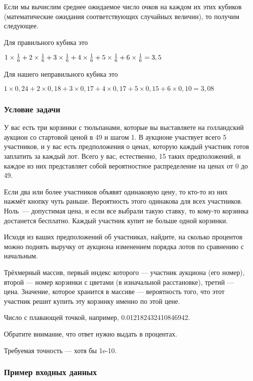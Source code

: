 Если мы вычислим среднее ожидаемое число очков на каждом их этих кубиков (математические ожидания соответствующих случайных величин), то получим следующее.

Для правильного кубика это 

$1 \times { 1 \over 6 } + 2 \times { 1 \over 6 } + 3 \times { 1 \over 6 } + 4 \times { 1 \over 6 }+5  \times { 1 \over 6 } +6 \times { 1 \over 6 } = 3,5$ 

Для нашего неправильного кубика это 

$1 \times 0,24 + 2 \times 0,18 + 3 \times 0,17 + 4 \times 0,17 + 5\times 0,15 + 6\times 0,10 = 3,08$  

\subsubsection*{Условие задачи}

У вас есть три корзинки с тюльпанами, которые вы выставляете на голландский аукцион со стартовой ценой в 49 и шагом 1.
В аукционе участвует всего 5 участников, и у вас есть предположения о ценах, которую каждый участник готов заплатить за каждый лот.
Всего у вас, естественно, 15 таких предположений, и каждое из них представляет собой вероятностное распределение на ценах от 0 до 49.

Если два или более участников объявят одинаковую цену, то кто-то из них нажмёт кнопку чуть раньше.
Вероятность этого одинакова для всех участников.
Ноль~— допустимая цена, и если все выбрали такую ставку, то кому-то корзинка достанется бесплатно.
Каждый участник купит не больше одной корзинки.

Исходя из ваших предположений об участниках, найдите, на сколько процентов можно поднять выручку от аукциона изменением порядка лотов по сравнению с начальным.


Трёхмерный массив, первый индекс которого — участник аукциона (его номер), второй — номер корзинки с цветами (в изначальной расстановке), третий — цена. Значение, которое хранится в массиве — вероятность того, что этот участник решит купить эту корзинку именно по этой цене.

\outputfmtSection

Число с плавающей точкой, например, 0.012182432410846942.

Обратите внимание, что ответ нужно выдать в процентах.

Требуемая точность — хотя бы 1e-10.

\subsubsection*{Пример входных данных}

